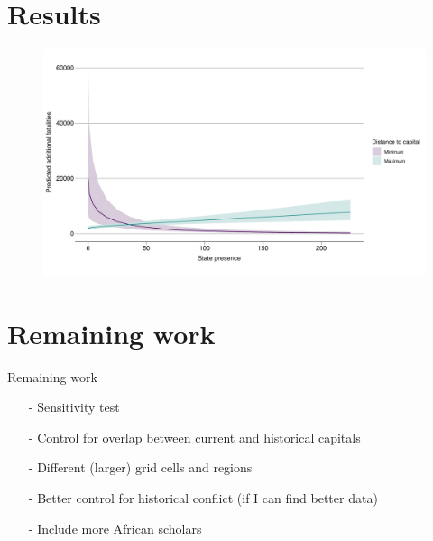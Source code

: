 \documentclass{beamer}
\begin{document}
\section{Results}

\begin{frame}
	\begin{figure}
		\includegraphics[width=\linewidth]{"../R/Output/interdeathszinbplot.pdf"}
	\end{figure}
\end{frame}

\section{Remaining work}

\begin{frame}{Remaining work}
	\begin{itemize}
		\item[-] Sensitivity test \pause
		\item[-] Control for overlap between current and historical
			capitals \pause
		\item[-] Different (larger) grid cells and regions \pasue
		\item[-] Better control for historical conflict (if I can find
			better data) \pause
		\item[-] Include more African scholars
	\end{itemize}
\end{frame}
\end{document}
